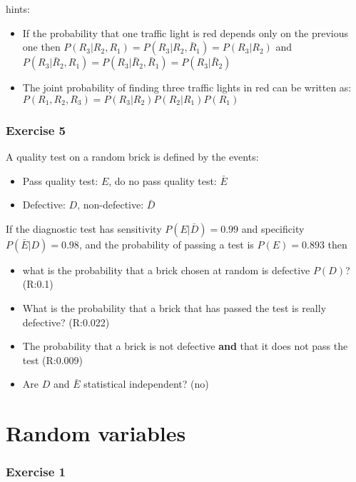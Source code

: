 \documentclass[
]{book}
\providecommand{\tightlist}{%
  \setlength{\itemsep}{0pt}\setlength{\parskip}{0pt}}
\begin{document}
hints:

\begin{itemize}
\item
  If the probability that one traffic light is red depends only on the previous one then
  \(P(R_3|R_2,R_1)=P(R_3|R_2,\bar{R}_1)=P(R_3|R_2)\) and \(P(R_3|\bar{R}_2,R_1)=P(R_3|\bar{R}_2,\bar{R}_1)=P(R_3|\bar{R}_2)\)
\item
  The joint probability of finding three traffic lights in red can be written as:
  \(P(R_1,R_2,R_3)=P(R_3|R_2)P(R_2|R_1)P(R_1)\)
\end{itemize}

\hypertarget{exercise-5}{%
\subsubsection{Exercise 5}\label{exercise-5}}

A quality test on a random brick is defined by the events:

\begin{itemize}
\tightlist
\item
  Pass quality test: \(E\), do no pass quality test: \(\bar{E}\)
\item
  Defective: \(D\), non-defective: \(\bar{D}\)
\end{itemize}

If the diagnostic test has sensitivity \(P(E|\bar{D})=0.99\) and specificity \(P(\bar{E}|D)=0.98\), and the probability of passing a test is \(P(E)=0.893\) then

\begin{itemize}
\item
  what is the probability that a brick chosen at random is defective \(P(D)\)? (R:0.1)
\item
  What is the probability that a brick that has passed the test is really defective? (R:0.022)
\item
  The probability that a brick is not defective \textbf{and} that it does not pass the test (R:0.009)
\item
  Are \(D\) and \(\bar{E}\) statistical independent? (no)
\end{itemize}

\hypertarget{random-variables}{%
\section{Random variables}\label{random-variables}}

\hypertarget{exercise-1-3}{%
\subsubsection{Exercise 1}\label{exercise-1-3}}
\end{document}
